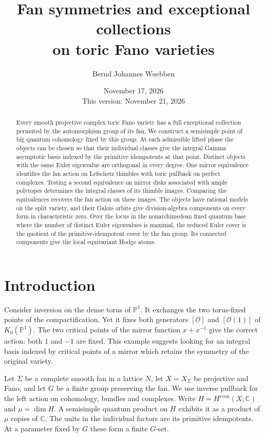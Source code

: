 \documentclass[11pt]{amsart}
\title[Fan symmetries and exceptional collections]{Fan symmetries and exceptional collections \\on toric Fano varieties}
\author{Bernd Johannes Wuebben}
\date{November 17, 2026\\This version: November 21, 2026}
\theoremstyle{definition}
\newcommand{\C}{\mathbb C}
\begin{document}
\begin{abstract}
Every smooth projective complex toric Fano variety has a full exceptional collection permuted by the automorphism group of its fan. We construct a semisimple point of big quantum cohomology fixed by this group. At each admissible lifted phase the objects can be chosen so that their individual classes give the integral Gamma asymptotic basis indexed by the primitive idempotents at that point. Distinct objects with the same Euler eigenvalue are orthogonal in every degree. One mirror equivalence identifies the fan action on Lefschetz thimbles with toric pullback on perfect complexes. Testing a second equivalence on mirror disks associated with ample polytopes determines the integral classes of its thimble images. Comparing the equivalences recovers the fan action on these images. The objects have rational models on the split variety, and their Galois orbits give division-algebra components on every form in characteristic zero. Over the locus in the nonarchimedean fixed quantum base where the number of distinct Euler eigenvalues is maximal, the reduced Euler cover is the quotient of the primitive-idempotent cover by the fan group. Its connected components give the local equivariant Hodge atoms.
\end{abstract}
\maketitle
\enlargethispage{2pt}
\section{Introduction}
Consider inversion on the dense torus of $\mathbb P^1$. It exchanges the two torus-fixed points of the compactification. Yet it fixes both generators $[\mathcal O]$ and $[\mathcal O(1)]$ of $K_0(\mathbb P^1)$. The two critical points of the mirror function $x+x^{-1}$ give the correct action: both $1$ and $-1$ are fixed. This example suggests looking for an integral basis indexed by critical points of a mirror which retains the symmetry of the original variety.

Let $\Sigma$ be a complete smooth fan in a lattice $N$, let $X=X_\Sigma$ be projective and Fano, and let $G$ be a finite group preserving the fan. We use inverse pullback for the left action on cohomology, bundles and complexes. Write $H=H^{\mathrm{even}}(X;\C)$ and $\mu=\dim H$. A semisimple quantum product on $H$ exhibits it as a product of $\mu$ copies of $\C$. The units in the individual factors are its primitive idempotents. At a parameter fixed by $G$ these form a finite $G$-set.
\end{document}
